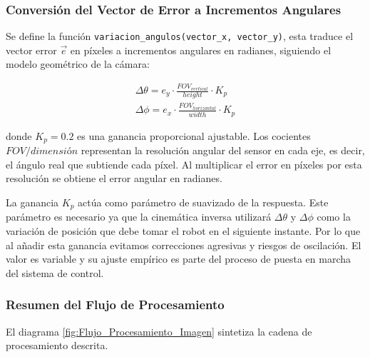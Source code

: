 \subsubsection{Conversión del Vector de Error a Incrementos Angulares}

Se define la función \texttt{variacion\_angulos(vector\_x, vector\_y)}, esta traduce el vector error $\vec{e}$ en píxeles a incrementos angulares en radianes, siguiendo el modelo geométrico de la cámara:

		\begin{equation}
    			\begin{aligned}
        			\Delta\theta=e_y\cdot\frac{FOV_{vertical}}{height}\cdot K_p\\
    				\Delta\phi=e_x\cdot\frac{FOV_{horizontal}}{width}\cdot K_p
    			\end{aligned}
  		\label{eq:CalcConversion}
		\end{equation}

donde $K_p=0.2$ es una ganancia proporcional ajustable. Los cocientes $FOV/dimensión$ representan la resolución angular del sensor en cada eje, es decir, el ángulo real que subtiende cada píxel. Al multiplicar el error en píxeles por esta resolución se obtiene el error angular en radianes.

La ganancia $K_p$ actúa como parámetro de suavizado de la respuesta. Este parámetro es necesario ya que la cinemática inversa utilizará $\Delta\theta$ y $\Delta\phi$ como la variación de posición que debe tomar el robot en el siguiente instante. Por lo que al añadir esta ganancia evitamos correcciones agresivas y riesgos de oscilación. El valor es variable y su ajuste empírico es parte del proceso de puesta en marcha del sistema de control.

\subsubsection{Resumen del Flujo de Procesamiento}

El diagrama \ref{fig:Flujo_Procesamiento_Imagen} sintetiza la cadena de procesamiento descrita.

